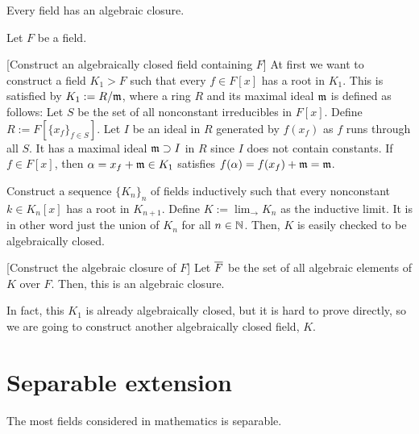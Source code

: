 \documentclass{../exp}
\begin{document}
\begin{thm}
Every field has an algebraic closure.
\end{thm}
\begin{pf}
Let $F$ be a field.

[Construct an algebraically closed field containing $F$]
At first we want to construct a field $K_1>F$ such that every $f\in F[x]$ has a root in $K_1$.
This is satisfied by $K_1:=R/\mathfrak{m}$, where a ring $R$ and its maximal ideal $\mathfrak{m}$ is defined as follows:
Let $S$ be the set of all nonconstant irreducibles in $F[x]$.
Define $R:=F[\{x_f\}_{f\in S}]$.
Let $I$ be an ideal in $R$ generated by $f(x_f)$ as $f$ runs through all $S$.
It has a maximal ideal $\mathfrak{m}\supset I$ in $R$ since $I$ does not contain constants.
If $f\in F[x]$, then $\alpha=x_f+\mathfrak{m}\in K_1$ satisfies $f(\alpha)=f(x_f)+\mathfrak{m}=\mathfrak{m}$.

Construct a sequence $\{K_n\}_n$ of fields inductively such that every nonconstant $k\in K_n[x]$ has a root in $K_{n+1}$.
Define $K:=\lim_{\to}K_n$ as the inductive limit.
It is in other word just the union of $K_n$ for all $n\in\mathbb{N}$.
Then, $K$ is easily checked to be algebraically closed.

[Construct the algebraic closure of $F$]
Let $\overline F$ be the set of all algebraic elements of $K$ over $F$.
Then, this is an algebraic closure.
\end{pf}
\begin{rmk}
In fact, this $K_1$ is already algebraically closed, but it is hard to prove directly, so we are going to construct another algebraically closed field, $K$.
\end{rmk}






























\section{Separable extension}

The most fields considered in mathematics is separable.
\end{document}
